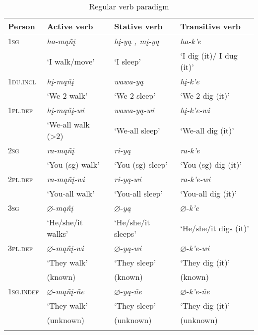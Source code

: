 \documentclass[output=paper]{LSP/langsci}
\begin{document}
\begin{table}
\begin{tabular}{l l l l }
\lsptoprule
Person	& Active verb & Stative verb & Transitive verb \\
\midrule
\textsc{1sg} 	& \textit{ha-m\k{a}ñ\k{i}} & \textit{h\k{i}-y\k{a} , m\k{i}-y\k{a}} & \textit{ha-k'e} \\
& `I walk/move'	& `I sleep'	 & `I dig (it)/ I dug (it)' \\

\textsc{1du.incl} & \textit{h\k{i}-m\k{a}ñ\k{i}} & \textit{wawa-y\k{a}} & \textit{h\k{i}-k'e} \\
 & `We 2 walk'	 & `We 2 sleep' & `We 2 dig (it)' \\

\textsc{1pl.def}  & \textit{h\k{i}-m\k{a}ñ\k{i}-wi} & \textit{wawa-y\k{a}-wi} & \textit{h\k{i}-k'e-wi} \\
 & `We-all walk (>2)  & `We-all sleep' & `We-all dig (it)' \\

\textsc{2sg}	& \textit{ra-m\k{a}ñ\k{i}} &  \textit{ri-y\k{a}} & \textit{ra-k'e} \\
& `You (sg) walk'	 & `You (sg) sleep' & `You (sg) dig (it)' \\

\textsc{2pl.def} & \textit{ra-m\k{a}ñ\k{i}-wi} & \textit{ri-y\k{a}-wi} & \textit{ra-k'e-wi} \\
 & `You-all walk' & `You-all sleep' & `You-all dig (it)' \\

\textsc{3sg} & $\varnothing$-\textit{m\k{a}ñ\k{i}} & $\varnothing$-\textit{y\k{a}} & $\varnothing$-\textit{k'e} \\
& `He/she/it walks' & `He/she/it sleeps'	 & `He/she/it digs (it)' \\

\textsc{3pl.def} & $\varnothing$-\textit{m\k{a}ñ\k{i}-wi} & $\varnothing$-\textit{y\k{a}-wi} & $\varnothing$-\textit{k'e-wi} \\
 & `They walk'  & `They sleep'  & `They dig (it)'  \\
& (known) & (known) & (known) \\

\textsc{1sg.indef} & $\varnothing$-\textit{m\k{a}ñ\k{i}-ñe} & $\varnothing$-\textit{y\k{a}-ñe} & $\varnothing$-\textit{k'e-ñe} \\
 & `They walk'	& `They sleep' &`They dig (it)'  \\
& (unknown) & (unknown) & (unknown) \\
\lspbottomrule
\end{tabular}
\caption{Regular verb paradigm} \label{regularverb}
\end{table}
\end{document}
